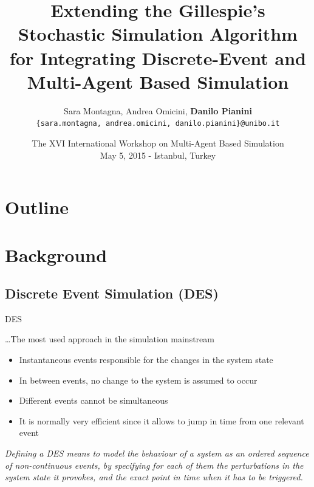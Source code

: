 \documentclass[presentation]{beamer} %
\title[Gillespie's SSA to Integrate DES and MABS]{Extending the Gillespie's Stochastic Simulation Algorithm for Integrating Discrete-Event and Multi-Agent Based Simulation}
\author[Montagna, Omicini, Pianini]{
Sara Montagna, Andrea Omicini, \textbf{Danilo Pianini}\\
\texttt{{\footnotesize \{sara.montagna, andrea.omicini, danilo.pianini\}@unibo.it}}}
\institute[UNIBO]
{\textsc{Alma Mater Studiorum}---Universit\`a di Bologna a Cesena}
\date[2015-05-15 MABS]{The XVI International Workshop on Multi-Agent Based Simulation\\
\scriptsize May 5, 2015 - Istanbul, Turkey
}
\begin{document}
\frame[label=coverpage]{\titlepage}

\section*{Outline}
\frame{\tableofcontents}



\section{Background}

\subsection{Discrete Event Simulation (DES)}


\begin{frame}{DES}

\ldots The most used approach in the simulation mainstream
\begin{block}{}
	\begin{itemize}
    		\item Instantaneous events responsible for the changes in the system state
    		\item In between events, no change to the system is assumed to occur
    		\item Different events cannot be simultaneous
		\item It is normally very efficient since it allows to jump in time from one relevant event
	\end{itemize}
\end{block}

		
\emph{Defining a DES means to model the behaviour of a system as an ordered sequence of non-continuous events, by specifying for each of them the \emph{perturbations} in the system state it provokes, and the exact point in time when it has to be triggered. }

\end{frame}
\end{document}

